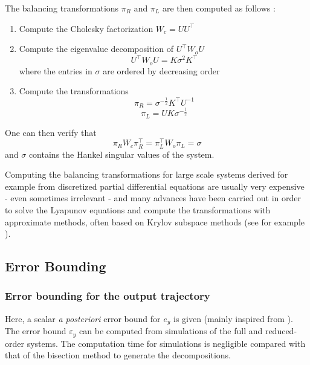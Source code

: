 The balancing transformations $\pi_R$ and $\pi_L$ are then computed as follows \cite{benner2010balanced}:
\begin{enumerate}
 \item Compute the Cholesky factorization $W_c = U U^\top$
 \item Compute the eigenvalue decomposition of $U^\top W_o U$
\[ U^\top W_o U = K \sigma^2 K^\top \]
where the entries in $\sigma$ are ordered by decreasing order
 \item Compute the transformations
\[ \pi_R = \sigma^{- \frac{1}{2}} K^\top U^{-1} \]
\[ \pi_L = U K \sigma^{- \frac{1}{2}} \]
\end{enumerate}

One can then verify that 
\[ \pi_R W_c \pi_R^\top = \pi_L^ {\top} W_o \pi_L = \sigma \]
and $\sigma$ contains the Hankel singular values of the system.

Computing the balancing transformations for large scale systems derived for example from discretized
partial differential equations are usually very expensive - even sometimes irrelevant - and many advances have been carried out 
in order to solve the Lyapunov equations and compute the transformations with approximate methods,
often based on Krylov subspace methods (see for example \cite{Antoulas2001,nong2009parameter,benner2008numerical}).

\subsection{Error Bounding}



\subsubsection{Error bounding for the output trajectory}
\label{sec:error_bounding}

Here, a scalar {\em a posteriori} error bound for $e_y$ is given (mainly inspired from
\cite{Han-Krogh04}).
The error bound $\varepsilon_y$ can be computed
from simulations of the full and reduced-order systems.
The computation time for simulations is negligible compared with
that of the bisection method to generate the decompositions.

